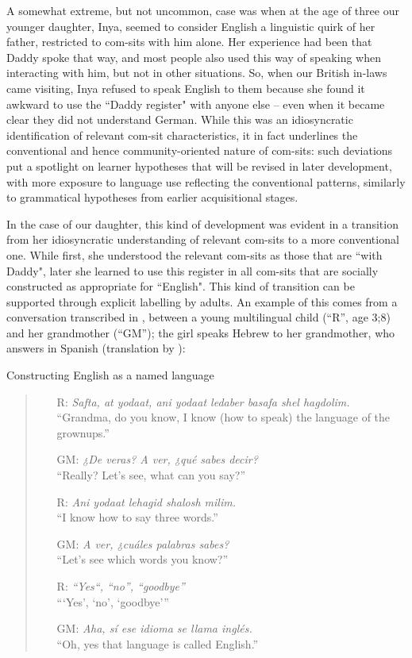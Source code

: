 A somewhat extreme, but not uncommon, case was when at the age of three our younger daughter, Inya, seemed to consider English a linguistic quirk of her father, restricted to com-sits with him alone. Her experience had been that Daddy spoke that way, and most people also used this way of speaking when interacting with him, but not in other situations. So, when our British in-laws came visiting, Inya refused to speak English to them because she found it awkward to use the “Daddy register" with anyone else – even when it became clear they did not understand German. While this was an idiosyncratic identification of relevant com-sit characteristics, it in fact underlines the conventional and hence community-oriented nature of com-sits: such deviations put a spotlight on learner hypotheses that will be revised in later development, with more exposure to language use reflecting the conventional patterns, similarly to grammatical hypotheses from earlier acquisitional stages.

In the case of our daughter, this kind of development was evident in a transition from her idiosyncratic understanding of relevant com-sits to a more conventional one. While first, she understood the relevant com-sits as those that are “with Daddy", later she learned to use this register in all com-sits that are socially constructed as appropriate for “English". This kind of transition can be supported through explicit labelling by adults. An example of this comes from a conversation transcribed in \citet[133--134]{StavansPorat2019}, between a young multilingual child (“R”, age 3;8) and her grandmother (“GM”); the girl speaks Hebrew to her grandmother, who answers in Spanish (translation by \citealt{StavansPorat2019}):

\ea\label{ex:constructingENG} Constructing English as a named language
\begin{quote}
   \begin{enumerate}
    \item [R: ] \textit{Safta, at yodaat, ani yodaat ledaber basafa shel hagdolim.}\\
    “Grandma, do you know, I know (how to speak) the language of the grownups.”
    \item[GM:] \textit{¿De veras? A ver, ¿qué sabes decir?}\\
    “Really? Let’s see, what can you say?”
    \item[R: ] \textit{Ani yodaat lehagid shalosh milim.}\\
    “I know how to say three words.”
    \item[GM:] \textit{A ver, ¿cuáles palabras sabes?}\\
    “Let’s see which words you know?”
    \item[R: ] \textit{“Yes“, “no”, “goodbye”}\\
    “‘Yes’, ‘no’, ‘goodbye’”
    \item[GM:] \textit{Aha, sí ese idioma se llama inglés.}\\
    “Oh, yes that language is called English.”
\end{enumerate} 
\end{quote}
\z

